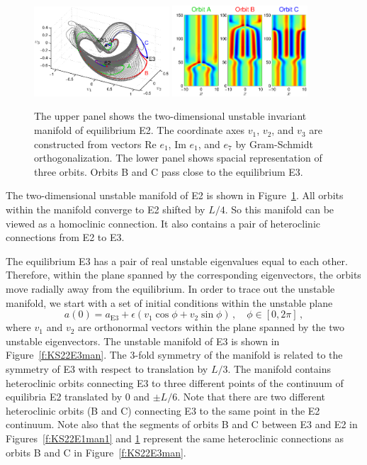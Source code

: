 \begin{figure}[h]\vspace*{-5pt} \centering
\includegraphics[width=0.45\textwidth]{figs/ks22_E2_manifold.eps}
\includegraphics[width=0.45\textwidth]{figs/ks22_E2_orbits.eps}
\vspace*{-5pt}\caption{ {\small The upper panel shows the two-dimensional
unstable invariant manifold of equilibrium E2. The coordinate axes
$v_1$, $v_2$, and $v_3$ are constructed from vectors
Re $e_1$, Im $e_1$, and $e_7$ by Gram-Schmidt orthogonalization.
The lower panel shows spacial representation of three orbits. Orbits
B and C pass close to the equilibrium E3.}}
\label{f:KS22E2man}\vspace*{-5pt}
\end{figure}

The two-dimensional unstable manifold of E2 is shown in
Figure~\ref{f:KS22E2man}.  All orbits within the manifold converge
to E2 shifted by $L/4$.  So this manifold can be viewed as a homoclinic
connection.  It also contains a pair of heteroclinic connections from
E2 to E3.

The equilibrium E3 has a pair of real unstable eigenvalues
equal to each other.  Therefore, within the plane spanned by the
corresponding eigenvectors, the orbits move radially away from
the equilibrium.  In order to trace out the unstable manifold,
we start with a set of initial conditions within the unstable plane
\[ a(0) = a_\mathrm{E3} + \epsilon(v_1 \cos \phi + v_2 \sin \phi)\,,
  \quad\phi\in[0,2\pi]\,, \]
where $v_1$ and $v_2$ are orthonormal vectors within the
plane spanned by the two unstable eigenvectors.  The unstable manifold
of E3 is shown in Figure~\ref{f:KS22E3man}.  The 3-fold symmetry of
the manifold is related to the symmetry of E3 with respect to
translation by $L/3$.  The manifold contains heteroclinic orbits
connecting E3 to three different points of the continuum of equilibria E2
translated by 0 and $\pm L/6$.  Note that there are two different
heteroclinic orbits (B and C) connecting E3 to the same point in the E2
continuum.  Note also that the segments of orbits B and C
between E3 and E2 in Figures~\ref{f:KS22E1man1} and \ref{f:KS22E2man}
represent the same heteroclinic connections as orbits B and C in
Figure~\ref{f:KS22E3man}.

